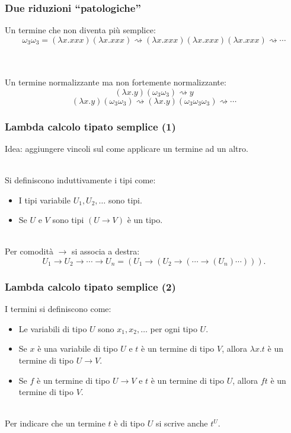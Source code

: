 \documentclass[aspectratio=43]{beamer}
\renewcommand{\l}{\lambda}
\newcommand{\conv}{\rightsquigarrow}
\newcommand{\ar}{\rightarrow}
\begin{document}
\begin{frame}
    \frametitle{Due riduzioni ``patologiche''}
    Un termine che non diventa pi\`u semplice:
    \[
        \omega_3\omega_3 = (\l x. xxx)(\l x. xxx) \conv (\l x. xxx)(\l x.
        xxx)(\l x. xxx) \conv \cdots
    \]
    \\~\
    
    Un termine normalizzante ma non fortemente normalizzante:
    \[
        (\l x. y)(\omega_3\omega_3) \conv y
    \]
    \[
        (\l x. y)(\omega_3\omega_3) \conv (\l x. y)(\omega_3\omega_3\omega_3)
        \conv \cdots
    \]
\end{frame}

\begin{frame}
    \frametitle{Lambda calcolo tipato semplice (1)}
    Idea: aggiungere vincoli sul come applicare un termine ad un altro.
    \\~\
    
    Si definiscono induttivamente i tipi come:
    \begin{itemize}
        \item I tipi variabile $U_1, U_2, \dots$ sono tipi.
        \item Se $U$ e $V$ sono tipi $(U\ar V)$ \`e un tipo.
    \\~\
    \end{itemize}

    Per comodit\`a $\ar$ si associa a destra:
    \[
        U_1\ar U_2\ar \cdots \ar U_n = (U_1 \ar ( U_2 \ar ( \cdots \ar (U_n)
        \cdots ))).
    \]
\end{frame}


\begin{frame}
    \frametitle{Lambda calcolo tipato semplice (2)}
    
    I termini si definiscono come:
    \begin{itemize}
        \item Le variabili di tipo $U$ sono $x_1, x_2, \dots$ per ogni tipo $U$.
        \item Se $x$ \`e una variabile di tipo $U$ e $t$ \`e un termine di tipo
            $V$, allora $\l x. t$ \`e un termine di tipo $U\ar V$.
        \item Se $f$ \`e un termine di tipo $U\ar V$ e $t$ \`e un termine di
            tipo $U$, allora $ft$ \`e un termine di tipo $V$.
    \\~\
    \end{itemize}

    Per indicare che un termine $t$ \`e di tipo $U$ si scrive anche $t^U$.
\end{frame}
\end{document}
